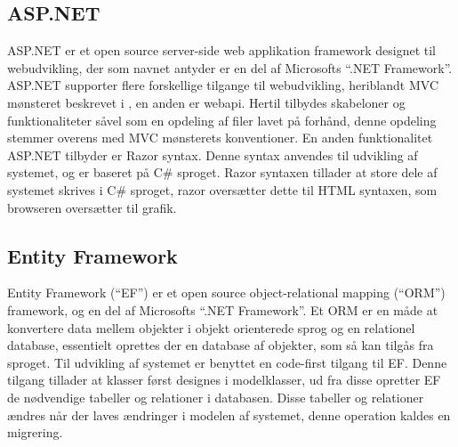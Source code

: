 \subsection{ASP.NET}
ASP.NET er et open source server-side web applikation framework designet til webudvikling, der som navnet antyder er en del af Microsofts ``.NET Framework''.
ASP.NET supporter flere forskellige tilgange til webudvikling, heriblandt MVC mønsteret beskrevet i , en anden er webapi.
Hertil tilbydes skabeloner og funktionaliteter såvel som en opdeling af filer lavet på forhånd, denne opdeling stemmer overens med MVC mønsterets konventioner.
En anden funktionalitet ASP.NET tilbyder er Razor syntax.
Denne syntax anvendes til udvikling af systemet, og er baseret på C\# sproget.
Razor syntaxen tillader at store dele af systemet skrives i C\# sproget, razor oversætter dette til HTML syntaxen, som browseren oversætter til grafik.

\subsection{Entity Framework}
Entity Framework (``EF'') er et open source object-relational mapping (``ORM'') framework, og en del af Microsofts ``.NET Framework''.
Et ORM er en måde at konvertere data mellem  objekter i objekt orienterede sprog og en relationel database, essentielt oprettes der en database af objekter, som så kan tilgås fra sproget.
Til udvikling af systemet er benyttet en code-first tilgang til EF.
Denne tilgang tillader at klasser først designes i modelklasser, ud fra disse opretter EF de nødvendige tabeller og relationer i databasen.
Disse tabeller og relationer ændres når der laves ændringer i modelen af systemet, denne operation kaldes en migrering.

